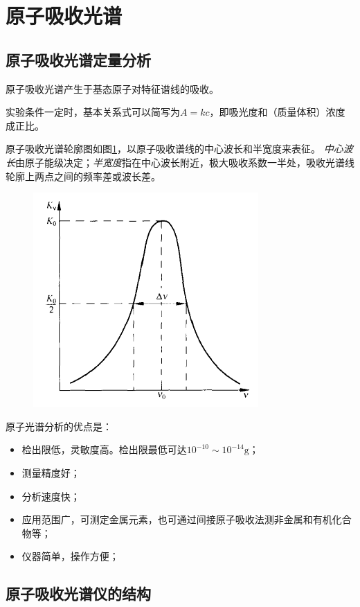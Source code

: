 \section{原子吸收光谱}

\subsection{原子吸收光谱定量分析}
原子吸收光谱产生于基态原子对特征谱线的吸收。

实验条件一定时，基本关系式可以简写为$A=kc$，即吸光度和（质量体积）浓度成正比。

原子吸收光谱轮廓图如图\ref{fig:chp8absorption}，以原子吸收谱线的中心波长和半宽度来表征。
\textit{中心波长}由原子能级决定；\textit{半宽度}指在中心波长附近，极大吸收系数一半处，吸收光谱线轮廓上两点之间的频率差或波长差。

\begin{figure}[!h]
	\centering
	\includegraphics[width=0.5\linewidth]{image/chp8_absorption}
	\caption{}
	\label{fig:chp8absorption}
\end{figure}

原子光谱分析的优点是：
\begin{itemize}
	\item 检出限低，灵敏度高。检出限最低可达$10^{-10}\sim 10^{-14}\mathrm{g}$；
	\item 测量精度好；
	\item 分析速度快；
	\item 应用范围广，可测定金属元素，也可通过间接原子吸收法测非金属和有机化合物等；
	\item 仪器简单，操作方便；
\end{itemize}

\subsection{原子吸收光谱仪的结构}

